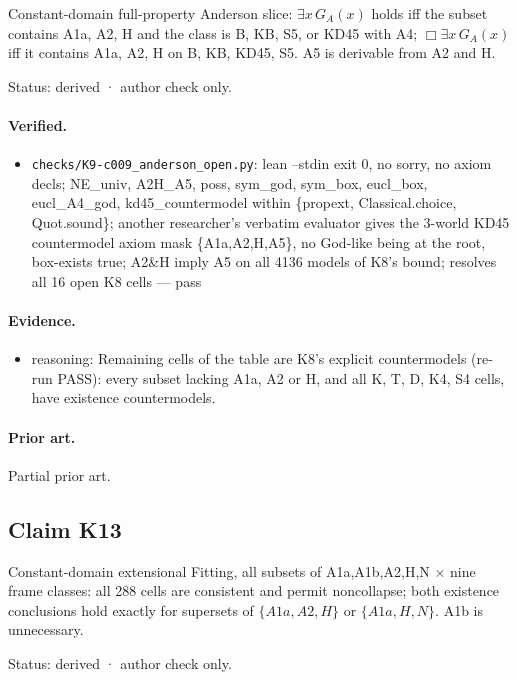 \documentclass{article}
\begin{document}
Constant-domain full-property Anderson slice: $\exists x\,G_A(x)$ holds iff the subset contains A1a, A2, H and the class is B, KB, S5, or KD45 with A4; $\Box\exists x\,G_A(x)$ iff it contains A1a, A2, H on B, KB, KD45, S5. A5 is derivable from A2 and H.

Status: derived · author check only.

\paragraph{Verified.}
\begin{itemize}
\item \texttt{checks/K9-c009\_anderson\_open.py}: lean --stdin exit 0, no sorry, no axiom decls; NE\_univ, A2H\_A5, poss, sym\_god, sym\_box, eucl\_box, eucl\_A4\_god, kd45\_countermodel within \{propext, Classical.choice, Quot.sound\}; another researcher's verbatim evaluator gives the 3-world KD45 countermodel axiom mask \{A1a,A2,H,A5\}, no God-like being at the root, box-exists true; A2\&H imply A5 on all 4136 models of K8's bound; resolves all 16 open K8 cells --- pass
\end{itemize}

\paragraph{Evidence.}
\begin{itemize}
\item reasoning: Remaining cells of the table are K8's explicit countermodels (re-run PASS): every subset lacking A1a, A2 or H, and all K, T, D, K4, S4 cells, have existence countermodels.
\end{itemize}

\paragraph{Prior art.} Partial prior art.

\subsection*{Claim K13}

Constant-domain extensional Fitting, all subsets of A1a,A1b,A2,H,N $\times$ nine frame classes: all 288 cells are consistent and permit noncollapse; both existence conclusions hold exactly for supersets of $\{A1a,A2,H\}$ or $\{A1a,H,N\}$. A1b is unnecessary.

Status: derived · author check only.
\end{document}

